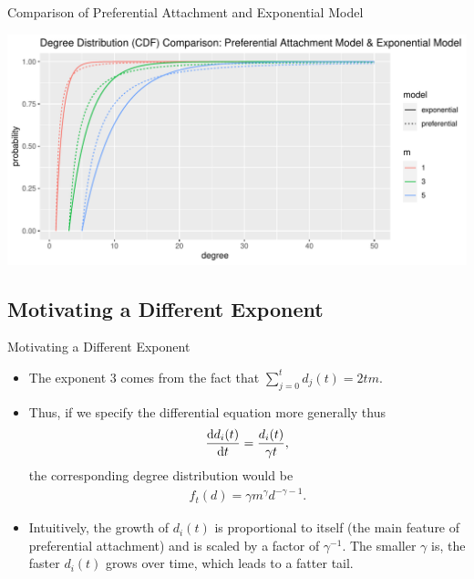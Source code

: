 \documentclass{beamer}
\begin{document}
\begin{frame}{Comparison of Preferential Attachment and Exponential Model}
	\begin{center}
		\includegraphics[width=\textwidth]{figures-R/comparison-cdf.pdf}
	\end{center}
\end{frame}

\subsection*{Motivating a Different Exponent}

\begin{frame}{Motivating a Different Exponent}
	\begin{itemize}
		\item
			The exponent $3$ comes from the fact that $\sum_{j=0}^{t}d_{j}(t)=2tm$.
		\item
			Thus, if we specify the differential equation more generally thus
			\begin{align*}
				\D{t}{d_{i}(t)} = \frac{d_{i}(t)}{\gamma t},
			\end{align*}
			the corresponding degree distribution would be
			\begin{align*}
				f_{t}(d) = \gamma m^{\gamma} d^{-\gamma-1}.
			\end{align*}
		\item
			Intuitively,
			the growth of $d_{i}(t)$ is proportional to itself (the main feature of preferential attachment)
			and is scaled by a factor of $\gamma^{-1}$.
			The smaller $\gamma$ is, the faster $d_{i}(t)$ grows over time,
			which leads to a fatter tail.
	\end{itemize}
\end{frame}
\end{document}
